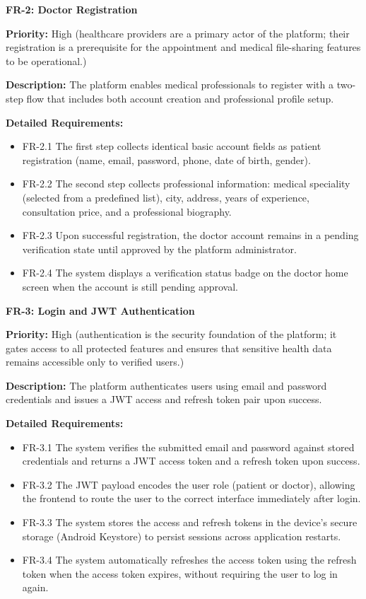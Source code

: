 \medskip

\textbf{FR-2: Doctor Registration}

\textbf{Priority:} High (healthcare providers are a primary actor of the platform; their registration is a prerequisite for the appointment and medical file-sharing features to be operational.)

\textbf{Description:} The platform enables medical professionals to register with a
two-step flow that includes both account creation and professional profile setup.

\textbf{Detailed Requirements:}
\begin{itemize}
    \item FR-2.1 \; The first step collects identical basic account fields as patient
    registration (name, email, password, phone, date of birth, gender).
    \item FR-2.2 \; The second step collects professional information: medical speciality
    (selected from a predefined list), city, address, years of experience, consultation
    price, and a professional biography.
    \item FR-2.3 \; Upon successful registration, the doctor account remains in a
    pending verification state until approved by the platform administrator.
    \item FR-2.4 \; The system displays a verification status badge on the doctor home
    screen when the account is still pending approval.
\end{itemize}

\medskip

\textbf{FR-3: Login and JWT Authentication}

\textbf{Priority:} High (authentication is the security foundation of the platform; it gates access to all protected features and ensures that sensitive health data remains accessible only to verified users.)

\textbf{Description:} The platform authenticates users using email and password credentials
and issues a JWT access and refresh token pair upon success.

\textbf{Detailed Requirements:}
\begin{itemize}
    \item FR-3.1 \; The system verifies the submitted email and password against stored
    credentials and returns a JWT access token and a refresh token upon success.
    \item FR-3.2 \; The JWT payload encodes the user role (patient or doctor), allowing
    the frontend to route the user to the correct interface immediately after login.
    \item FR-3.3 \; The system stores the access and refresh tokens in the device's secure
    storage (Android Keystore) to persist sessions across application restarts.
    \item FR-3.4 \; The system automatically refreshes the access token using the refresh
    token when the access token expires, without requiring the user to log in again.
\end{itemize}

